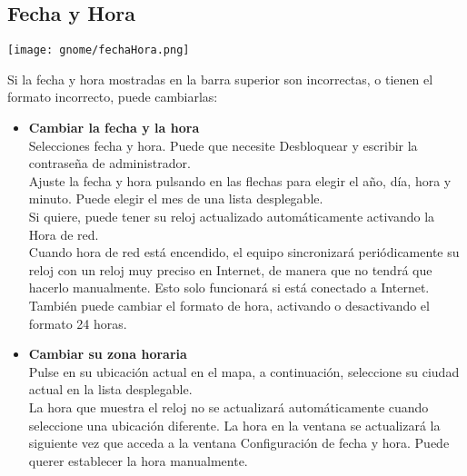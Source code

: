 	\subsection{Fecha y Hora}
	\begin{center}
			\texttt{[image: gnome/fechaHora.png]} 
		\end{center}
	Si la fecha y hora mostradas en la barra superior son incorrectas, o tienen el formato incorrecto, puede cambiarlas:\\
\begin{itemize}
\item {\large \bf Cambiar la fecha y la hora}\\
Selecciones fecha y hora.
Puede que necesite Desbloquear y escribir la contraseña de administrador.\\
Ajuste la fecha y hora pulsando en las flechas para elegir el año, día, hora y minuto. Puede elegir el mes de una lista desplegable.\\
Si quiere, puede tener su reloj actualizado automáticamente activando la Hora de red.\\
Cuando hora de red está encendido, el equipo sincronizará periódicamente su reloj con un reloj muy preciso en Internet, de manera que no tendrá que hacerlo manualmente. Esto solo funcionará si está conectado a Internet.\\
También puede cambiar el formato de hora, activando o desactivando el formato 24 horas.
\item {\large \bf Cambiar su zona horaria}\\
Pulse en su ubicación actual en el mapa, a continuación, seleccione su ciudad actual en la lista desplegable.\\
La hora que muestra el reloj no se actualizará automáticamente cuando seleccione una ubicación diferente. La hora en la ventana se actualizará la siguiente vez que acceda a la ventana Configuración de fecha y hora. Puede querer establecer la hora manualmente.
		
\end{itemize}